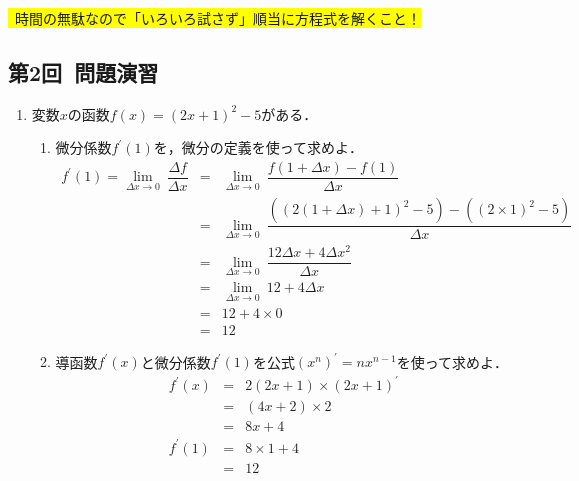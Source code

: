 \documentclass[a4paper,11pt]{ltjsarticle}
\newcommand{\dlim}[2]{\displaystyle{\lim_{#1 \to #2}\:}}
\begin{document}
\begin{center}
  \colorbox{yellow}{\ast\ 時間の無駄なので「いろいろ試さず」順当に方程式を解くこと！}
\end{center}

\subsection{第2回\ 問題演習}

\begin{enumerate}
  \item 変数$x$の函数$f(x)=(2x+1)^2-5$がある．
  \begin{enumerate}
    \item[①] 微分係数$f^{\prime}(1)$を，微分の定義を使って求めよ．
    \begin{equation}
      \renewcommand{\arraystretch}{2}
      \begin{array}{rcl}
        f^{\prime}(1) = \dlim{\Delta x}{0}\dfrac{\Delta f}{\Delta x}
        &=&
        \dlim{\Delta x}{0}\dfrac{f(1+\Delta x)-f(1)}{\Delta x}
        \\
        &=&
        \dlim{\Delta x}{0}\dfrac{((2(1+\Delta x)+1)^{2}-5)-((2 \times 1)^{2}-5)}{\Delta x}
        \\
        &=&
        \dlim{\Delta x}{0}\dfrac{12 \Delta x+4 \Delta x^{2}}{\Delta x}
        \\
        &=&
        \dlim{\Delta x}{0}12+4 \Delta x
        \\
        &=&
        12+4 \times 0
        \\
        &=&
        12
      \end{array}
    \end{equation}
    \item[②] 導函数$f^{\prime}(x)$と微分係数$f^{\prime}(1)$を公式$(x^{n})^{\prime}=nx^{n-1}$を使って求めよ．
    \begin{equation}
      \renewcommand{\arraystretch}{2}
      \begin{array}{rcl}
        f^{\prime}(x)
        &=&
        2(2x+1) \times (2x+1)^{\prime}
        \\
        &=&
        (4x+2) \times 2
        \\
        &=&
        8x+4 \\
        f^{\prime}(1)
        &=&
        8 \times 1 + 4
        \\
        &=&
        12
      \end{array}
    \end{equation}
  \end{enumerate}


\end{enumerate}
\end{document}
